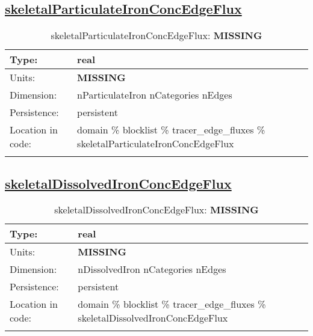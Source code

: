 \subsection[skeletalParticulateIronConcEdgeFlux]{\hyperref[sec:var_tab_tracer_edge_fluxes]{skeletalParticulateIronConcEdgeFlux}}
\label{subsec:var_sec_tracer_edge_fluxes_skeletalParticulateIronConcEdgeFlux}
\begin{center}
\begin{longtable}{| p{2.0in} | p{4.0in} |}
        \hline 
        Type: & real \\
        \hline 
        Units: & {\bf \color{red} MISSING} \\
        \hline 
        Dimension: & nParticulateIron nCategories nEdges \\
        \hline 
        Persistence: & persistent \\
        \hline 
         Location in code: & domain \% blocklist \% tracer\_edge\_fluxes \% skeletalParticulateIronConcEdgeFlux \\
         \hline 
    \caption{skeletalParticulateIronConcEdgeFlux: {\bf \color{red} MISSING}}
\end{longtable}
\end{center}
\subsection[skeletalDissolvedIronConcEdgeFlux]{\hyperref[sec:var_tab_tracer_edge_fluxes]{skeletalDissolvedIronConcEdgeFlux}}
\label{subsec:var_sec_tracer_edge_fluxes_skeletalDissolvedIronConcEdgeFlux}
\begin{center}
\begin{longtable}{| p{2.0in} | p{4.0in} |}
        \hline 
        Type: & real \\
        \hline 
        Units: & {\bf \color{red} MISSING} \\
        \hline 
        Dimension: & nDissolvedIron nCategories nEdges \\
        \hline 
        Persistence: & persistent \\
        \hline 
         Location in code: & domain \% blocklist \% tracer\_edge\_fluxes \% skeletalDissolvedIronConcEdgeFlux \\
         \hline 
    \caption{skeletalDissolvedIronConcEdgeFlux: {\bf \color{red} MISSING}}
\end{longtable}
\end{center}
